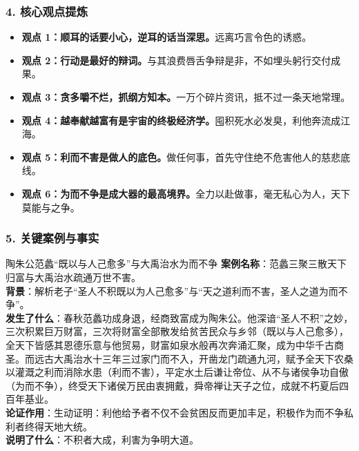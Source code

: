 \subsubsection{4. 核心观点提炼}
\begin{itemize}
    \item \textbf{观点 1：顺耳的话要小心，逆耳的话当深思。}远离巧言令色的诱惑。
    \item \textbf{观点 2：行动是最好的辩词。}与其浪费唇舌争辩是非，不如埋头躬行交付成果。
    \item \textbf{观点 3：贪多嚼不烂，抓纲方知本。}一万个碎片资讯，抵不过一条天地常理。
    \item \textbf{观点 4：越奉献越富有是宇宙的终极经济学。}囤积死水必发臭，利他奔流成江海。
    \item \textbf{观点 5：利而不害是做人的底色。}做任何事，首先守住绝不危害他人的慈悲底线。
    \item \textbf{观点 6：为而不争是成大器的最高境界。}全力以赴做事，毫无私心为人，天下莫能与之争。
\end{itemize}

\subsubsection{5. 关键案例与事实}
\begin{CaseBox}{陶朱公范蠡“既以与人己愈多”与大禹治水为而不争}
\textbf{案例名称}：范蠡三聚三散天下归富与大禹治水疏通万世不害。\\
\textbf{背景}：解析老子“圣人不积既以为人己愈多”与“天之道利而不害，圣人之道为而不争”。\\
\textbf{发生了什么}：春秋范蠡功成身退，经商致富成为陶朱公。他深谙“圣人不积”之妙，三次积累巨万财富，三次将财富全部散发给贫苦民众与乡邻（既以与人己愈多），全天下皆感其恩德乐意与他贸易，财富如泉水般再次奔涌汇聚，成为中华千古商圣。而远古大禹治水十三年三过家门而不入，开凿龙门疏通九河，赋予全天下农桑以灌溉之利而消除水患（利而不害），平定水土后谦让帝位、从不与诸侯争功自傲（为而不争），终受天下诸侯万民由衷拥戴，舜帝禅让天子之位，成就不朽夏后四百年基业。\\
\textbf{论证作用}：生动证明：利他给予者不仅不会贫困反而更加丰足，积极作为而不争私利者终得天地大统。\\
\textbf{说明了什么}：不积者大成，利害为争明大道。
\end{CaseBox}

